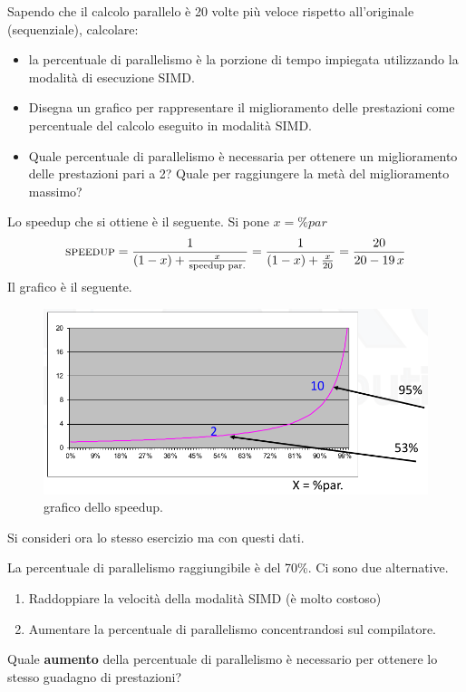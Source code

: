 \begin{exercise}
	Sapendo che il calcolo parallelo è 20 volte più veloce rispetto all'originale (sequenziale), calcolare:
	\begin{itemize}
		\item  la percentuale di parallelismo è la porzione di tempo impiegata utilizzando la modalità di esecuzione SIMD.
		\item Disegna un grafico per rappresentare il miglioramento delle prestazioni come percentuale del calcolo eseguito in modalità SIMD.
		\item  Quale percentuale di parallelismo è necessaria per ottenere un miglioramento delle prestazioni pari a 2? Quale per raggiungere la metà del miglioramento massimo?
	\end{itemize}
\end{exercise}
\begin{solution}
	Lo speedup che si ottiene è il seguente. Si pone $x=\% par$
	\begin{align*}
		\textsc{speedup} = \frac{1}{(1-x)+\frac{x}{\text{speedup par.}}} = \frac{1}{(1-x)+\frac{x}{20}} = \frac{20}{20-19 \, x}
	\end{align*}
	Il grafico è il seguente.
	\begin{figure}[ht]
		\centering
		\includegraphics[width=0.7\linewidth]{img/graph-ex4}
		\caption{grafico dello speedup.}
		\label{fig:graph-ex4}
	\end{figure}
\end{solution}
Si consideri ora lo stesso esercizio ma con questi dati.
\begin{exercise}
	La percentuale di parallelismo raggiungibile è del 70\%. Ci sono due alternative.
	\begin{enumerate}
		\item Raddoppiare la velocità della modalità SIMD (è molto costoso)
		\item Aumentare la percentuale di parallelismo concentrandosi sul compilatore.
	\end{enumerate}
	Quale \textbf{aumento} della percentuale di parallelismo è necessario per ottenere lo stesso guadagno di prestazioni?
\end{exercise}
